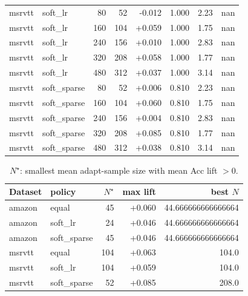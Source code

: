 \begin{table}[t]
\begin{tabular}{llrrrrrr}
msrvtt & soft\_lr & 80 & 52 & -0.012 & 1.000 & 2.23 & nan \\
msrvtt & soft\_lr & 160 & 104 & +0.059 & 1.000 & 1.75 & nan \\
msrvtt & soft\_lr & 240 & 156 & +0.010 & 1.000 & 2.83 & nan \\
msrvtt & soft\_lr & 320 & 208 & +0.058 & 1.000 & 1.77 & nan \\
msrvtt & soft\_lr & 480 & 312 & +0.037 & 1.000 & 3.14 & nan \\
msrvtt & soft\_sparse & 80 & 52 & +0.006 & 0.810 & 2.23 & nan \\
msrvtt & soft\_sparse & 160 & 104 & +0.060 & 0.810 & 1.75 & nan \\
msrvtt & soft\_sparse & 240 & 156 & +0.004 & 0.810 & 2.83 & nan \\
msrvtt & soft\_sparse & 320 & 208 & +0.085 & 0.810 & 1.77 & nan \\
msrvtt & soft\_sparse & 480 & 312 & +0.038 & 0.810 & 3.14 & nan \\
\bottomrule
\end{tabular}
\end{table}

\begin{table}[t]
\centering
\caption{$N^\star$: smallest mean adapt-sample size with mean Acc lift $>0$.}
\label{tab:agod-soft-lr-nstar}
\begin{tabular}{llrrr}
\toprule
Dataset & policy & $N^\star$ & max lift & best $N$ \\
\midrule
amazon & equal & 45 & +0.060 & 44.666666666666664 \\
amazon & soft\_lr & 24 & +0.046 & 44.666666666666664 \\
amazon & soft\_sparse & 45 & +0.046 & 44.666666666666664 \\
msrvtt & equal & 104 & +0.063 & 104.0 \\
msrvtt & soft\_lr & 104 & +0.059 & 104.0 \\
msrvtt & soft\_sparse & 52 & +0.085 & 208.0 \\
\bottomrule
\end{tabular}
\end{table}
